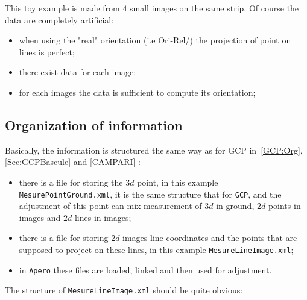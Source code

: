 This toy example is made from $4$ small images on the same strip. Of course the data are completely  artificial:

\begin{itemize}
   \item when using the "real" orientation (i.e Ori-Rel/) the projection of point on lines is perfect;
   \item there exist data for each image;
   \item for each images the data is sufficient to compute its orientation;
\end{itemize}


\subsection{Organization of information}

Basically, the information is structured the same way as for GCP in~\ref{GCP:Org},\ref{Sec:GCPBascule} and
\ref{CAMPARI} :

\begin{itemize}
   \item there is a file for storing the $3d$ point, in this example {\tt MesurePointGround.xml}, it is the same
         structure that for {\tt GCP}, and the adjustment of this point can mix measurement of $3d$ in ground,
         $2d$ points in images and $2d$ lines in images;

   \item there is a file for storing $2d$ images line coordinates and the points that are supposed to project
         on these lines, in this example {\tt MesureLineImage.xml};

   \item in {\tt Apero} these files are loaded, linked and then used for adjustment.
\end{itemize}

The structure of {\tt MesureLineImage.xml} should be quite obvious:

